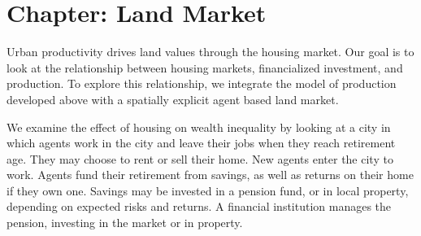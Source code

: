 \section{Chapter: Land Market}

Urban productivity %
drives land values through the housing market.%
Our goal is to look at the relationship between housing markets, financialized investment, and production. %
To explore this relationship, we integrate the model of production developed above with a spatially explicit agent based land market. %

We examine the effect of housing on wealth inequality by looking at 
a city in which agents work in the city and leave their jobs when they reach retirement age. They may choose to rent or sell their home. %
New agents enter the city to work. 
Agents fund their retirement from savings, as well as returns on their home if they own one. Savings may be invested in a pension fund, or in local property,  depending on expected risks and returns. %
A financial institution manages the pension, investing in the market or in property.

 
